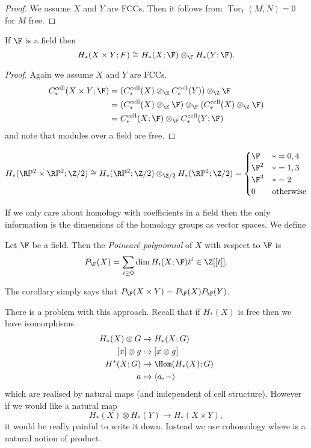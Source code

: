 \documentclass[a4paper]{article}
\renewcommand*{\P}{\mathbb{P}}
\newcommand{\cell}{\mathrm{cell}}
\DeclareMathOperator{\Tor}{Tor} %
\begin{document}
\begin{proof}
  We assume \(X\) and \(Y\) are FCCs. Then it follows from \(\Tor_1(M, N) = 0\) for \(M\) free.
\end{proof}

\begin{corollary}
  If \(\F\) is a field then
  \[
    H_*(X \times Y; F) \cong H_*(X; \F) \otimes_\F H_*(Y; \F).
  \]
\end{corollary}

\begin{proof}
  Again we assume \(X\) and \(Y\) are FCCs.
  \begin{align*}
    C_*^\cell(X \times Y; \F)
    &= (C_*^\cell(X) \otimes_\Z C_*^\cell(Y)) \otimes_\Z \F \\
    &= (C_*^\cell(X) \otimes_\Z \F) \otimes_\F (C_*^\cell(X) \otimes_\Z \F) \\
    &= C_*^\cell(X; \F) \otimes_\F C_*^\cell(Y; \F)
  \end{align*}
  and note that modules over a field are free.
\end{proof}

\begin{eg}
  \[
    H_*(\R\P^2 \times \R\P^2; \Z/2)
    \cong H_*(\R\P^2; \Z/2) \otimes_{\Z/2} H_*(\R\P^2; \Z/2)
    =
    \begin{cases}
      \F & * = 0, 4 \\
      \F^2 & * = 1, 3 \\
      \F^3 & * = 2 \\
      0 & \text{otherwise}
    \end{cases}
  \]
\end{eg}

If we only care about homology with coefficients in a field then the only information is the dimensions of the homology groups as vector spaces. We define

\begin{definition}
  Let \(\F\) be a field. Then the \emph{Poincaré polynomial} of \(X\) with respect to \(\F\) is
  \[
    P_\F(X) = \sum_{i \geq 0} \dim H_i(X; \F) t^i \in \Z[[t]].
  \]
\end{definition}

The corollary simply says that \(P_\F(X \times Y) = P_\F(X) P_\F(Y)\).

There is a problem with this approach. Recall that if \(H_*(X)\) is free then we have isomorphisms
\begin{align*}
  H_*(X) \otimes G &\to H_*(X; G) \\
  [x] \otimes g &\mapsto [x \otimes g] \\
  H^*(X; G) &\to \Hom(H_*(X); G) \\
  a &\mapsto \langle a, - \rangle
\end{align*}
which are realised by natural maps (and independent of cell structure). However if we would like a natural map
\[
  H_*(X) \otimes H_*(Y) \to H_*(X \times Y),
\]
it would be really painful to write it down. Instead we use cohomology where is a natural notion of product.
\end{document}
